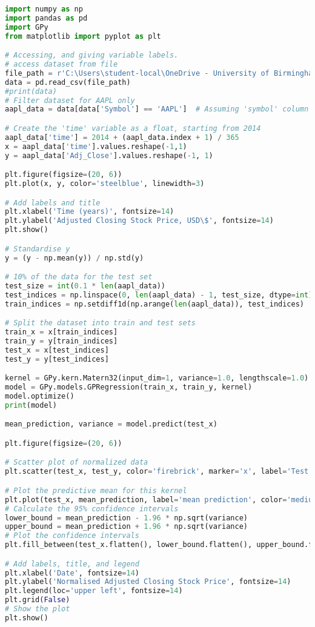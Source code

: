 \documentclass[12pt,a4paper]{article}
\begin{document}
\vspace{10pt}
\begin{lstlisting}[language=python, caption={Code of the Creation of Figures \ref{fig:Mat dataset plot} and \ref{fig:Mat GPregression}}]
import numpy as np
import pandas as pd
import GPy
from matplotlib import pyplot as plt

# Accessing, and giving variable labels.
# access dataset from file
file_path = r'C:\Users\student-local\OneDrive - University of Birmingham\Dissertation\gafa_stock.csv'
data = pd.read_csv(file_path)
#print(data)
# Filter dataset for AAPL only
aapl_data = data[data['Symbol'] == 'AAPL']  # Assuming 'symbol' column identifies stock ticker

# Create the 'time' variable as a float, starting from 2014
aapl_data['time'] = 2014 + (aapl_data.index + 1) / 365
x = aapl_data['time'].values.reshape(-1,1)
y = aapl_data['Adj_Close'].values.reshape(-1, 1)

plt.figure(figsize=(20, 6))
plt.plot(x, y, color='steelblue', linewidth=3)

# Add labels and title
plt.xlabel('Time (years)', fontsize=14)
plt.ylabel('Adjusted Closing Stock Price, USD\$', fontsize=14)
plt.show()

# Standardise y
y = (y - np.mean(y)) / np.std(y)

# 10% of the data for the test set
test_size = int(0.1 * len(aapl_data))  
test_indices = np.linspace(0, len(aapl_data) - 1, test_size, dtype=int)
train_indices = np.setdiff1d(np.arange(len(aapl_data)), test_indices)

# Split the dataset into train and test sets
train_x = x[train_indices]  
train_y = y[train_indices]  
test_x = x[test_indices]    
test_y = y[test_indices]    

kernel = GPy.kern.Matern32(input_dim=1, variance=1.0, lengthscale=1.0)
model = GPy.models.GPRegression(train_x, train_y, kernel)
model.optimize()
print(model)

mean_prediction, variance = model.predict(test_x)

plt.figure(figsize=(20, 6))

# Scatter plot of normalized data
plt.scatter(test_x, test_y, color='firebrick', marker='x', label='Test samples', s=30)

# Plot the predictive mean for this kernel
plt.plot(test_x, mean_prediction, label='mean prediction', color='mediumpurple', linewidth=3)
# Calculate the 95% confidence intervals
lower_bound = mean_prediction - 1.96 * np.sqrt(variance)
upper_bound = mean_prediction + 1.96 * np.sqrt(variance)
# Plot the confidence intervals
plt.fill_between(test_x.flatten(), lower_bound.flatten(), upper_bound.flatten(),label='95% credible intervals', color='plum', alpha=0.4)

# Add labels, title, and legend
plt.xlabel('Date', fontsize=14)
plt.ylabel('Normalised Adjusted Closing Stock Price', fontsize=14)
plt.legend(loc='upper left', fontsize=14)
plt.grid(False)
# Show the plot
plt.show()
\end{lstlisting}
\end{document}
